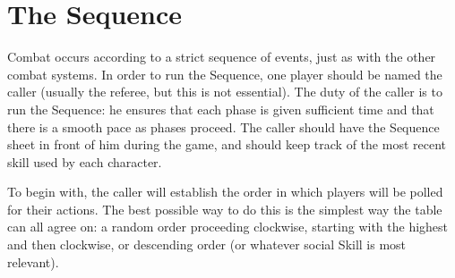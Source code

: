 \section{The Sequence}\label{sec:social-combat-sequence}

Combat occurs according to a strict sequence of events, just as with the other combat systems. In order to run the Sequence, one player should be named the caller (usually the referee, but this is not essential). The duty of the caller is to run the Sequence: he ensures that each phase is given sufficient time and that there is a smooth pace as phases proceed. The caller should have the Sequence sheet in front of him during the game, and should keep track of the most recent skill used by each character.



To begin with, the caller will establish the order in which players will be polled for their actions. The best possible way to do this is the simplest way the table can all agree on: a random order proceeding clockwise, starting with the highest  and then clockwise, or descending order  (or whatever social Skill is most relevant). 

